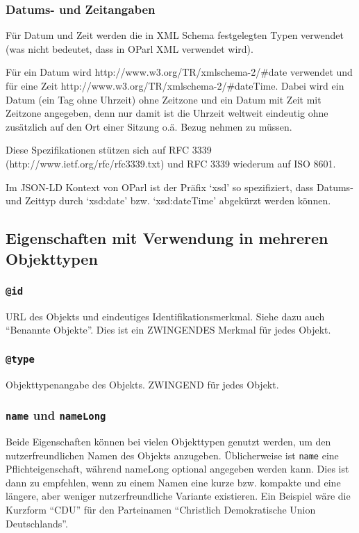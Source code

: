 \documentclass[,a4paper]{article}
\begin{document}
\subsubsection{Datums- und Zeitangaben}\label{datums--und-zeitangaben}

Für Datum und Zeit werden die in XML Schema festgelegten Typen verwendet
(was nicht bedeutet, dass in OParl XML verwendet wird).

Für ein Datum wird http://www.w3.org/TR/xmlschema-2/\#date verwendet und
für eine Zeit http://www.w3.org/TR/xmlschema-2/\#dateTime. Dabei wird
ein Datum (ein Tag ohne Uhrzeit) ohne Zeitzone und ein Datum mit Zeit
mit Zeitzone angegeben, denn nur damit ist die Uhrzeit weltweit
eindeutig ohne zusätzlich auf den Ort einer Sitzung o.ä. Bezug nehmen zu
müssen.

Diese Spezifikationen stützen sich auf RFC 3339
(http://www.ietf.org/rfc/rfc3339.txt) und RFC 3339 wiederum auf ISO
8601.

Im JSON-LD Kontext von OParl ist der Präfix `xsd' so spezifiziert, dass
Datums- und Zeittyp durch `xsd:date' bzw. `xsd:dateTime' abgekürzt
werden können.

\subsection{Eigenschaften mit Verwendung in mehreren
Objekttypen}\label{eigenschaften-mit-verwendung-in-mehreren-objekttypen}

\subsubsection{\texttt{@id}}\label{id}

URL des Objekts und eindeutiges Identifikationsmerkmal. Siehe dazu auch
``Benannte Objekte''. Dies ist ein ZWINGENDES Merkmal für jedes Objekt.

\subsubsection{\texttt{@type}}\label{type}

Objekttypenangabe des Objekts. ZWINGEND für jedes Objekt.

\subsubsection{\texttt{name} und
\texttt{nameLong}}\label{name-und-namelong}

Beide Eigenschaften können bei vielen Objekttypen genutzt werden, um den
nutzerfreundlichen Namen des Objekts anzugeben. Üblicherweise ist
\texttt{name} eine Pflichteigenschaft, während nameLong optional
angegeben werden kann. Dies ist dann zu empfehlen, wenn zu einem Namen
eine kurze bzw. kompakte und eine längere, aber weniger
nutzerfreundliche Variante existieren. Ein Beispiel wäre die Kurzform
``CDU'' für den Parteinamen ``Christlich Demokratische Union
Deutschlands''.
\end{document}
